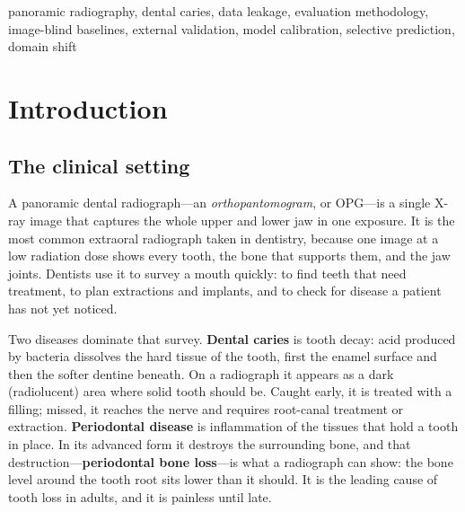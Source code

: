 \documentclass[conference]{IEEEtran}
\begin{document}
\begin{abstract}
external radiographs it beat the constant by 9.3 percentage points pooled, at three
of the four hospitals, while flagging fewer teeth than it, on a cohort that had also
informed its adoption. Five prior
attempts to improve the classifier, leaving the task unchanged, had all returned
intervals spanning zero.
We do not conclude that automated caries screening fails. We conclude that a
tooth-level score alone cannot establish that a system is reading the
radiograph---a pipeline can clear an image-blind floor on the data it was built
on and be indistinguishable from it elsewhere---and that four things a constant
cannot do---identifying which tooth,
reporting a confidence that behaves like a probability, declining when
uncertain, and being measured on outside institutions---are where the evidence
for a working system has to come from.
\end{abstract}

\begin{IEEEkeywords}
panoramic radiography, dental caries, data leakage, evaluation
methodology, image-blind baselines, external validation, model calibration,
selective prediction, domain shift
\end{IEEEkeywords}

\section{Introduction}

\subsection*{The clinical setting}

A panoramic dental radiograph---an \emph{orthopantomogram}, or OPG---is a single
X-ray image that captures the whole upper and lower jaw in one exposure. It is
the most common extraoral radiograph taken in dentistry, because one image at a
low radiation dose shows every tooth, the bone that supports them, and the jaw
joints. Dentists use it to survey a mouth quickly: to find teeth that need
treatment, to plan extractions and implants, and to check for disease a patient
has not yet noticed.

Two diseases dominate that survey. \textbf{Dental caries} is tooth decay: acid
produced by bacteria dissolves the hard tissue of the tooth, first the enamel
surface and then the softer dentine beneath. On a radiograph it appears as a
dark (radiolucent) area where solid tooth should be. Caught early, it is treated
with a filling; missed, it reaches the nerve and requires root-canal treatment or
extraction. \textbf{Periodontal disease} is inflammation of the tissues that
hold a tooth in place. In its advanced form it destroys the surrounding bone,
and that destruction---\textbf{periodontal bone loss}---is what a radiograph can
show: the bone level around the tooth root sits lower than it should. It is the
leading cause of tooth loss in adults, and it is painless until late.
\end{document}
